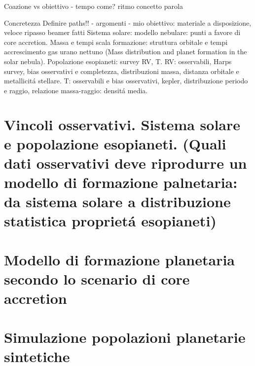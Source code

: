 \documentclass[10pt,xcolor={usenames},fleqn,serif]{beamer}
\begin{document}
\begin{wordonframe}{Coazione vs obiettivo - tempo come?}
ritmo concetto parola
\end{wordonframe}

\begin{wordonframe}{Concretezza}
Definire paths!! - argomenti - mio obiettivo: materiale a disposizione, veloce ripasso beamer fatti
Sistema solare: modello nebulare: punti a favore di core accretion. Massa e tempi scala formazione: struttura orbitale  e tempi accrescimento gas urano nettuno (Mass distribution and planet formation in the solar nebula).
Popolazione esopianeti: survey RV, T. RV: osservabili, Harps survey, bias osservativi e completezza, distribuzioni massa, distanza orbitale e metallicit\'a stellare. T: osservabili e bias osservativi, kepler, distribuzione periodo e raggio, relazione massa-raggio: densit\'a media.
\end{wordonframe}

\part{Vincoli osservativi. Sistema solare e popolazione esopianeti. (Quali dati osservativi deve riprodurre un modello di formazione palnetaria: da sistema solare a distribuzione statistica propriet\'a esopianeti)}



\part{Modello di formazione planetaria secondo lo scenario di core accretion}


\part{Simulazione popolazioni planetarie sintetiche}

\end{document}
